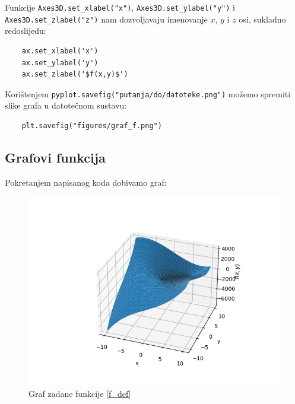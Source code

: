 Funkcije \verb|Axes3D.set_xlabel("x")|, \verb|Axes3D.set_ylabel("y")| i\\\verb|Axes3D.set_zlabel("z")| nam dozvoljavaju imenovanje $x$, $y$ i $z$ osi, sukladno redoslijedu:
\begin{verbatim}
    ax.set_xlabel('x')
    ax.set_ylabel('y')
    ax.set_zlabel('$f(x,y)$')
\end{verbatim}

Korištenjem \verb|pyplot.savefig("putanja/do/datoteke.png")| možemo spremiti slike grafa u datotečnom sustavu:
\begin{verbatim}
    plt.savefig("figures/graf_f.png")
\end{verbatim}

\newpage

\subsection{Grafovi funkcija}

Pokretanjem napisanog koda dobivamo graf:
\begin{figure}[H]
    \centering
    \includegraphics[width=400pt]{figures/graf_f.png}
    \caption{Graf zadane funkcije \eqref{f_def}}
\end{figure}

